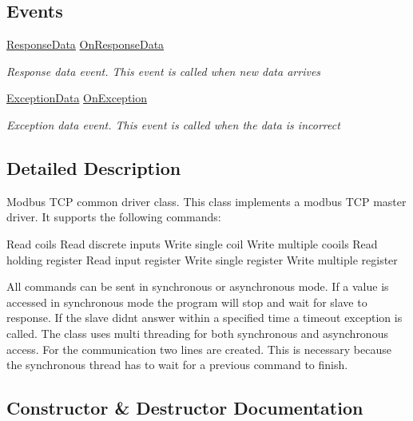 \subsection*{Events}
\begin{DoxyCompactItemize}
\item 
\hyperlink{class_robo_library_1_1_mod_bus_a497317cafb760023aef4af60fba95c0b}{Response\+Data} \hyperlink{class_robo_library_1_1_mod_bus_a7b2d5617e91faf204d0c8454676353f3}{On\+Response\+Data}
\begin{DoxyCompactList}\small\item\em Response data event. This event is called when new data arrives\end{DoxyCompactList}\item 
\hyperlink{class_robo_library_1_1_mod_bus_ac78341a28ded6af9cc33c594315e7c06}{Exception\+Data} \hyperlink{class_robo_library_1_1_mod_bus_af04afd761811816c0018a8788c33524f}{On\+Exception}
\begin{DoxyCompactList}\small\item\em Exception data event. This event is called when the data is incorrect\end{DoxyCompactList}\end{DoxyCompactItemize}


\subsection{Detailed Description}
Modbus T\+CP common driver class. This class implements a modbus T\+CP master driver. It supports the following commands\+: 

Read coils Read discrete inputs Write single coil Write multiple cooils Read holding register Read input register Write single register Write multiple register

All commands can be sent in synchronous or asynchronous mode. If a value is accessed in synchronous mode the program will stop and wait for slave to response. If the slave didn\textquotesingle{}t answer within a specified time a timeout exception is called. The class uses multi threading for both synchronous and asynchronous access. For the communication two lines are created. This is necessary because the synchronous thread has to wait for a previous command to finish.

\subsection{Constructor \& Destructor Documentation}
\hypertarget{class_robo_library_1_1_mod_bus_a060babdf6c052c1b86a160d8ddf68ef1}{}\label{class_robo_library_1_1_mod_bus_a060babdf6c052c1b86a160d8ddf68ef1} 
